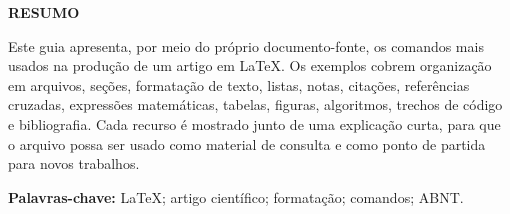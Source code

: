 \thispagestyle{empty}
\begin{center}
  \textbf{RESUMO}
\end{center}

Este guia apresenta, por meio do próprio documento-fonte, os comandos mais usados na produção de um artigo em \LaTeX. Os exemplos cobrem organização em arquivos, seções, formatação de texto, listas, notas, citações, referências cruzadas, expressões matemáticas, tabelas, figuras, algoritmos, trechos de código e bibliografia. Cada recurso é mostrado junto de uma explicação curta, para que o arquivo possa ser usado como material de consulta e como ponto de partida para novos trabalhos.

\begin{center}
  \textbf{Palavras-chave:} \LaTeX; artigo científico; formatação; comandos; ABNT.
\end{center}
\newpage
